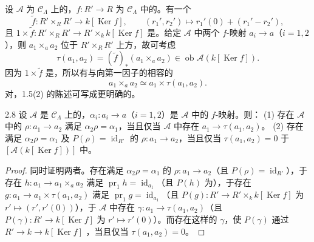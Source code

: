 设 $\mathcal A$ 为 $\mathcal C_\Lambda$ 上的，$f:R'\to R$ 为 $\mathcal C_\Lambda$ 中的。有一个
\[\widetilde f:R'\times_RR'\longrightarrow k[\operatorname{Ker}f],\qquad
(r_1',r_2')\longmapsto r_1'(0)+(r_1'-r_2'),\]
且 $1\times\widetilde f:R'\times_RR'\to R'\times_k k[\operatorname{Ker}f]$ 是。给定 $\mathcal A$ 中两个 $f$-映射 $a_i\to a$（$i=1,2$），则 $a_1\times_a a_2$ 位于 $R'\times_RR'$ 上方，故可考虑
\[\tau(a_1,a_2)=(\widetilde f)_*(a_1\times_a a_2)\in\operatorname{ob}\mathcal A(k[\operatorname{Ker}f]).\]
因为 $1\times\widetilde f$ 是，所以有与向第一因子的相容的
\[a_1\times_a a_2\simeq a_1\times\tau(a_1,a_2).\]
对，1.5(2) 的陈述可写成更明确的。
\begin{SGAresult}{}{2.8}
设 $\mathcal A$ 是 $\mathcal C_\Lambda$ 上的，$\alpha_i:a_i\to a$（$i=1,2$）是 $\mathcal A$ 中的 $f$-映射。则：
(1) 存在 $\mathcal A$ 中的 $\rho:a_1\to a_2$ 满足 $\alpha_2\rho=\alpha_1$，当且仅当 $\mathcal A$ 中存在 $a_1\to\tau(a_1,a_2)$。
(2) 存在满足 $\alpha_2\rho=\alpha_1$ 及 $P(\rho)=\operatorname{id}_{R'}$ 的 $\rho:a_1\to a_2$，当且仅当 $\tau(a_1,a_2)=0$ 于 $[\mathcal A(k[\operatorname{Ker}f])]$ 中。
\end{SGAresult}
\begin{proof}
同时证明两者。存在满足 $\alpha_2\rho=\alpha_1$ 的 $\rho:a_1\to a_2$（且 $P(\rho)=\operatorname{id}_{R'}$），于存在 $h:a_1\to a_1\times_a a_2$ 满足 $\operatorname{pr}_1h=\operatorname{id}_{a_1}$（且 $P(h)$ 为），于存在 $g:a_1\to a_1\times\tau(a_1,a_2)$ 满足 $\operatorname{pr}_1g=\operatorname{id}_{a_1}$（且 $P(g):R'\to R'\times_k k[\operatorname{Ker}f]$ 为 $r'\mapsto(r',r'(0))$），于 $\mathcal A$ 中存在 $\gamma:a_1\to\tau(a_1,a_2)$（且 $P(\gamma):R'\to k[\operatorname{Ker}f]$ 为 $r'\mapsto r'(0)$）。而存在这样的 $\gamma$，使 $P(\gamma)$ 通过 $R'\to k\to k[\operatorname{Ker}f]$ ，当且仅当 $\tau(a_1,a_2)=0$。
\end{proof}
